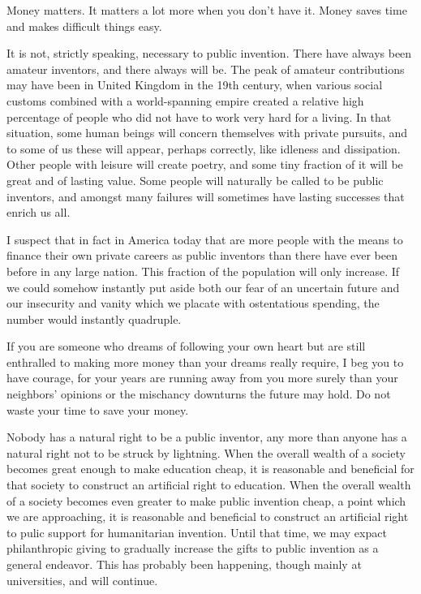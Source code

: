 \documentclass[
	fontsize=10pt, %
	twoside=false, %
	secnumdepth=1, %
]{kaobook}
\begin{document}
Money matters. It matters a lot more when you don't have it.
Money saves time and makes difficult things easy.

It is not, strictly speaking, necessary to public invention.
There have always been amateur inventors, and there always will be.
The peak of amateur contributions may have been in United Kingdom in the
19th century, when various social customs combined with a world-spanning
empire created a relative high percentage of people who did not have
to work very hard for a living. In that situation, some human beings
will concern themselves with private pursuits, and to some of us
these will appear, perhaps correctly, like idleness and dissipation.
Other people with leisure will create poetry,
and some tiny fraction of it will be great and of lasting value.
Some people will naturally be called to be public inventors, and
amongst many failures will sometimes have lasting successes
that enrich us all.

I suspect that in fact in America today that are more people
with the means to finance their own private careers as public inventors
than there have ever been before in any large nation.
This fraction of the population will
only increase. If we could somehow instantly put aside both our
fear of an uncertain future and our insecurity and vanity which
we placate with ostentatious spending, the number would instantly
quadruple.

If you are someone who dreams of following your own heart but
are still enthralled to making more money than your dreams really
require, I beg you to have courage, for your years are running
away from you more surely than your neighbors' opinions or the
mischancy downturns the future may hold. Do not waste your
time to save your money.

Nobody has a natural right to be a public inventor, any more than
anyone has a natural right not to be struck by lightning.
When the overall wealth of a society becomes great enough to make
education cheap, it is reasonable and beneficial for that society to construct an
artificial right to education. When the overall wealth of a society
becomes even greater to make public invention cheap, a point which
we are approaching, it is reasonable and beneficial to construct
an artificial right to pulic support for humanitarian invention.
Until that time, we may expact philanthropic giving to gradually
increase the gifts to public invention as a general endeavor.
This has probably been happening, though mainly at universities, and will continue.
\end{document}
